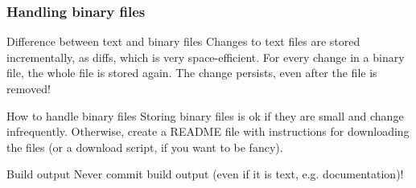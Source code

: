 
\begin{frame}[fragile]
	\frametitle{Handling binary files}
	
	\begin{block}{Difference between text and binary files}
	Changes to text files are stored incrementally, as diffs, which is very space-efficient. For every change in a binary file, the whole file is stored again. The change persists, even after the file is removed!
	\end{block}
	
	\begin{block}{How to handle binary files}
	Storing binary files is ok if they are small and change infrequently. Otherwise, create a README file with instructions for downloading the files (or a download script, if you want to be fancy).
	\end{block}
	
	\begin{block}{Build output}
	\alert{Never} commit build output (even if it is text, e.g. documentation)!
	\end{block}
\end{frame}